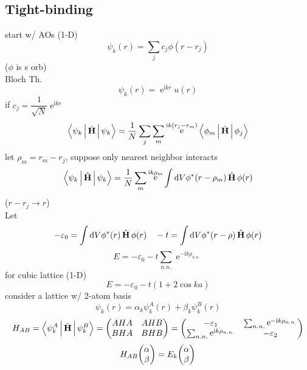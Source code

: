 \documentclass[UTF8]{ctexart} %
\DeclareMathOperator{\e}{\mathrm{e}}
\renewcommand{\I}{\mathrm{i}}
\DeclareMathOperator{\ra}{\rightarrow}
\DeclareMathOperator{\hH}{\hat{\vb{H}}}
\numberwithin{equation}{section}
\begin{document}
\subsection{Tight-binding}
start w/ AOs (1-D)
\begin{equation}\label{key}
\psi_k(r) = \sum_j c_j\phi(r - r_j)
\end{equation}
($ \phi $ is s orb)\\
Bloch Th.
\begin{equation}\label{key}
\psi_k(r) = \e^{\I k r} u(r)
\end{equation}
if $ c_j = \dfrac{1}{\sqrt{N}}\e^{\I kr} $
\begin{equation}\label{key}
\Braket{\psi_k | \hH | \psi_k} = \dfrac{1}{N}\sum_j\sum_m \e^{\I k(r_j - r_m)}\Braket{\phi_m | \hH | \phi_j}
\end{equation}
let $ \rho_m = r_m - r_j $, suppose only nearest neighbor interacts
\begin{equation}\label{key}
\Braket{\psi_k | \hH | \psi_k} = \dfrac{1}{N}\sum_m\e^{\I k\rho_m}\int\dd V \phi^*(r - \rho_m)\hH\phi(r)
\end{equation}
($ r - r_j \ra r $)\\
Let
\begin{equation}\label{key}
-\varepsilon_0 = \int\dd V \phi^*(r)\hH\phi(r) \quad -t = \int\dd V \phi^*(r - \rho)\hH\phi(r)
\end{equation}
\begin{equation}\label{key}
E = -\varepsilon_0 - t\sum_{n.n.}\e^{-\I k\rho_{n.n.}}
\end{equation}
for cubic lattice (1-D)
\begin{equation}\label{key}
E = -\varepsilon_0 -t (1 + 2\cos ka)
\end{equation}
consider a lattice w/ 2-atom basis
\begin{equation}\label{key}
\psi_k(r) = \alpha_k\psi_k^A(r) + \beta_k\psi_k^B(r)
\end{equation}
\begin{equation}\label{key}
H_{AB} = \Braket{\psi_k^A | \hH | \psi_k^B}
= \mqty( AHA & AHB\\
		BHA & BHB)
= \mqty(-\varepsilon_1 & \sum_{n.n.}\e^{-\I k\rho_{n.n.}}\\
		\sum_{n.n.}\e^{\I k\rho_{n.n.}} & -\varepsilon_2)
\end{equation}
\begin{equation}\label{key}
H_{AB} \mqty(\alpha\\ \beta) = E_k \mqty(\alpha\\ \beta)
\end{equation}
\end{document}
